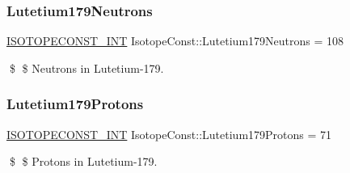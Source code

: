 \subsubsection{\texorpdfstring{Lutetium179\+Neutrons}{Lutetium179Neutrons}}
{\footnotesize\ttfamily \mbox{\hyperlink{group___isotope_const-_macros_ga5f18360b3e99483a35c32d789e62621c}{I\+S\+O\+T\+O\+P\+E\+C\+O\+N\+S\+T\+\_\+\+I\+NT}} Isotope\+Const\+::\+Lutetium179\+Neutrons = 108}

\$ \$ Neutrons in Lutetium-\/179. \mbox{\label{group___isotope_const-_lutetium-_lu179_gaa9bcd609b3e2886e595a5dfa4debc75b}} 
\subsubsection{\texorpdfstring{Lutetium179\+Protons}{Lutetium179Protons}}
{\footnotesize\ttfamily \mbox{\hyperlink{group___isotope_const-_macros_ga5f18360b3e99483a35c32d789e62621c}{I\+S\+O\+T\+O\+P\+E\+C\+O\+N\+S\+T\+\_\+\+I\+NT}} Isotope\+Const\+::\+Lutetium179\+Protons = 71}

\$ \$ Protons in Lutetium-\/179. 